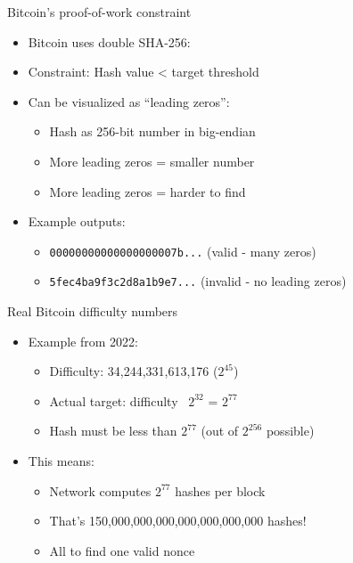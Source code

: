 \documentclass[aspectratio=169, lualatex, handout]{beamer}
\begin{document}
\begin{frame}{Bitcoin's proof-of-work constraint}
	\begin{itemize}
		\item Bitcoin uses double SHA-256: 
		\item Constraint: Hash value < target threshold
		\item Can be visualized as ``leading zeros'':
		      \begin{itemize}
			      \item Hash as 256-bit number in big-endian
			      \item More leading zeros = smaller number
			      \item More leading zeros = harder to find
		      \end{itemize}
		\item Example outputs:
		      \begin{itemize}
			      \item \texttt{00000000000000000007b...} (valid - many zeros)
			      \item \texttt{5fec4ba9f3c2d8a1b9e7...} (invalid - no leading zeros)
		      \end{itemize}
	\end{itemize}
\end{frame}

\begin{frame}{Real Bitcoin difficulty numbers}
	\begin{itemize}
		\item Example from 2022:
		      \begin{itemize}
			      \item Difficulty: 34,244,331,613,176 (\approx$2^{45}$)
			      \item Actual target: difficulty \times\ $2^{32}$ = $2^{77}$
			      \item Hash must be less than $2^{77}$ (out of $2^{256}$ possible)
		      \end{itemize}
		\item This means:
		      \begin{itemize}
			      \item Network computes \approx$2^{77}$ hashes per block
			      \item That's 150,000,000,000,000,000,000,000 hashes!
			      \item All to find one valid nonce
		      \end{itemize}
	\end{itemize}
\end{frame}
\end{document}
